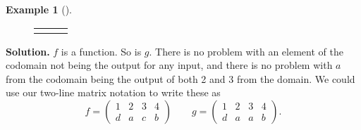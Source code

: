 \documentclass[10pt,]{book}
\theoremstyle{plain}
\theoremstyle{definition}
\newtheorem{example}[theorem]{Example}
\theoremstyle{definition}
\theoremstyle{definition}
\numberwithin{equation}{section}
\newlength{\panelmax}
\newcommand{\amp}{ & }
\begin{document}
\begin{example}[]
{{{{}
}}
\newlength{\phRimage}\setlength{\phRimage}{\ht\panelboxRimage+\dp\panelboxRimage}
\settototalheight{\phRimage}{\usebox{\panelboxRimage}}
\setlength{\panelmax}{\maxof{\panelmax}{\phRimage}}
\leavevmode%
\setlength{\tabcolsep}{0.0166666666666667\textwidth}
\begin{figure}
\hspace*{0.0166666666666667\textwidth}%
\begin{tabular}{@{}*{3}{c}@{}}
\begin{minipage}[c][\panelmax][t]{0.3\textwidth}\usebox{\panelboxPimage}\end{minipage}&
\begin{minipage}[c][\panelmax][t]{0.3\textwidth}\usebox{\panelboxQimage}\end{minipage}&
\begin{minipage}[c][\panelmax][t]{0.3\textwidth}\usebox{\panelboxRimage}\end{minipage}\end{tabular}
\end{figure}
}%
\par\medskip\noindent%
\textbf{Solution.}\quad 
          \(f\) is a function. So is \(g\). There is no problem with an element of the codomain not being the output for any input, and there is no problem with \(a\) from the codomain being the output of both 2 and 3 from the domain. We could use our two-line matrix notation to write these as
          \begin{equation*}
            f= \begin{pmatrix} 1 \amp 2 \amp 3 \amp 4 \\ d \amp a \amp c \amp b \end{pmatrix} \qquad g = \begin{pmatrix} 1 \amp 2 \amp 3 \amp 4 \\ d \amp a \amp a \amp b \end{pmatrix}.
          \end{equation*}

\par


\end{example}
\end{document}
